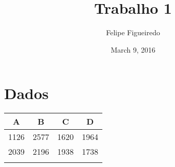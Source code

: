 \documentclass[]{article}
\title{Trabalho 1}
\author{Felipe Figueiredo}
\date{March 9, 2016}
\begin{document}
\maketitle


\section{Dados}\label{dados}

\begin{longtable}[c]{@{}cccc@{}}
\toprule
\begin{minipage}[b]{0.06\columnwidth}\centering\strut
A
\strut\end{minipage} &
\begin{minipage}[b]{0.06\columnwidth}\centering\strut
B
\strut\end{minipage} &
\begin{minipage}[b]{0.06\columnwidth}\centering\strut
C
\strut\end{minipage} &
\begin{minipage}[b]{0.06\columnwidth}\centering\strut
D
\strut\end{minipage}\tabularnewline
\midrule
\endhead
\begin{minipage}[t]{0.06\columnwidth}\centering\strut
1126
\strut\end{minipage} &
\begin{minipage}[t]{0.06\columnwidth}\centering\strut
2577
\strut\end{minipage} &
\begin{minipage}[t]{0.06\columnwidth}\centering\strut
1620
\strut\end{minipage} &
\begin{minipage}[t]{0.06\columnwidth}\centering\strut
1964
\strut\end{minipage}\tabularnewline
\begin{minipage}[t]{0.06\columnwidth}\centering\strut
2039
\strut\end{minipage} &
\begin{minipage}[t]{0.06\columnwidth}\centering\strut
2196
\strut\end{minipage} &
\begin{minipage}[t]{0.06\columnwidth}\centering\strut
1938
\strut\end{minipage} &
\begin{minipage}[t]{0.06\columnwidth}\centering\strut
1738
\strut\end{minipage}\tabularnewline
\begin{minipage}[t]{0.06\columnwidth}\centering\strut

\end{minipage}
\end{longtable}
\end{document}
